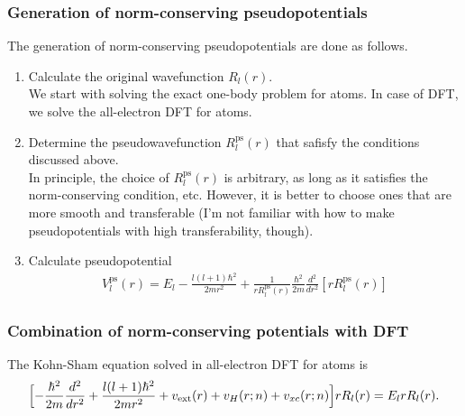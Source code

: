 \documentclass{article}
\begin{document}
\subsubsection{Generation of norm-conserving pseudopotentials}
The generation of norm-conserving pseudopotentials are done as follows.
\begin{enumerate}
  \item Calculate the original wavefunction $R_l(r)$.\\
  We start with solving the exact one-body problem for atoms. In case of DFT, we solve the all-electron DFT for atoms.
  \item Determine the pseudowavefunction $R^{\text{ps}}_l(r)$ that safisfy the conditions discussed above.\\
  In principle, the choice of $R^{\text{ps}}_l(r)$ is arbitrary, as long as it satisfies the norm-conserving condition, etc.
  However, it is better to choose ones that are more smooth and transferable (I'm not familiar with how to make pseudopotentials with high transferability, though).
  \item Calculate pseudopotential
  \begin{align}
    V^{\text{ps}}_l(r) = E_l - \frac{l(l+1)\hbar^2}{2mr^2} + \frac{1}{rR^{\text{ps}}_l(r)}  \frac{\hbar^2}{2m} \frac{d^2}{dr^2} [rR^{\text{ps}}_l(r)]
  \end{align}
\end{enumerate}
\subsubsection{Combination of norm-conserving potentials with DFT}
The Kohn-Sham equation solved in all-electron DFT for atoms is 
\begin{align}
  \Bigl[
    - \frac{\hbar^2}{2m} \frac{d^2}{dr^2} + \frac{l(l+1)\hbar^2}{2mr^2} +  v_{\text{ext}}(r) + v_H(r;n) + v_{xc}(r;n)
  \Bigr] rR_l(r) = E_l r R_l(r).
\end{align}
\end{document}
